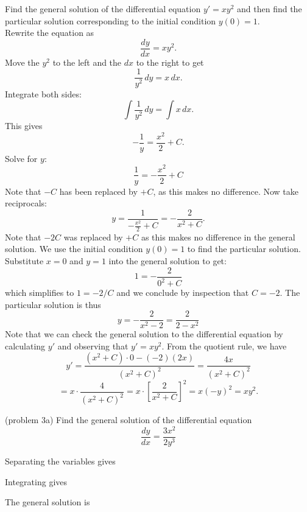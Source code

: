 \documentclass[handout]{ximera}
\begin{document}
\begin{example}[example 3]
Find the general solution of the differential equation $y' = xy^2$ and then find the particular solution corresponding to the initial condition $y(0) = 1$.\\
Rewrite the equation as 
\[
\frac{dy}{dx} = xy^2.
\]
Move the $y^2$ to the left and the $dx$ to the right to get
\[
\frac{1}{y^2} \, dy = x \,  dx.
\]
Integrate both sides:
\[
\int \frac{1}{y^2}\,  dy  = \int x \, dx.
\]
This gives
\[
-\frac{1}{y} = \frac{x^2}{2} + C.
\]
Solve for $y$:
\[
\frac{1}{y} = -\frac{x^2}{2} + C
\]
Note that $-C$ has been replaced by $+C$, as this makes no difference. Now take reciprocals:
\[
y = \frac{1}{-\frac{x^2}{2} + C} = - \frac{2}{x^2 + C}.
\]
Note that $-2C$ was replaced by $+C$ as this makes no difference in the general solution.
We use the initial condition $y(0) = 1$ to find the particular solution. Substitute $x= 0$ and $y = 1$ into the general solution to get:
\[
1 = -\frac{2}{0^2 + C}
\]
which simplifies to $1 = -2/C$ and we conclude by inspection that $C = -2$.
The particular solution is thus
\[
y = - \frac{2}{x^2 -2}  = \frac{2}{2-x^2}
\]
Note that we can check the general solution to the differential equation by 
calculating $y'$ and observing that $y' = xy^2$.
From the quotient rule, we have
\[
y' = \frac{(x^2 + C)\cdot 0 - (-2)(2x)}{(x^2 + C)^2} = \frac{4x}{(x^2 + C)^2} 
\]
\[
= x \cdot \frac{4}{(x^2 + C)^2} = x \cdot \left[\frac{2}{x^2 + C}\right]^2 = x(-y)^2 = xy^2.
\]



\end{example}


\begin{problem}(problem 3a)
Find the general solution of the differential equation
\[
\frac{dy}{dx} = \frac{3x^2}{2y^3}
\]

Separating the variables gives

\begin{multipleChoice}
\end{multipleChoice}

Integrating gives

\begin{multipleChoice}
\end{multipleChoice}

The general solution is

\begin{multipleChoice}
\end{multipleChoice}

\end{problem}
\end{document}
